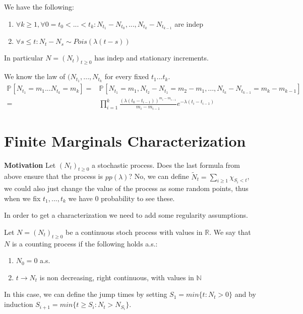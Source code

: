\begin{theorem}
We have the following:
\begin{enumerate}
	\item $\forall k \geq 1, \forall 0=t_0<...<t_k: N_{t_1}-N_{t_0},...,N_{t_k}- N_{t_{k-1}}$ are indep
	\item $\forall s \leq t: N_t - N_s \sim Pois(\lambda (t-s))$
\end{enumerate}
In particular $N=(N_t)_{t\geq 0}$ has indep and stationary increments.
	
\end{theorem}

We know the law of $(N_{t_1},...,N_{t_k}$ for every fixed $t_1...t_k$. 
\begin{align}
	\mathbb{P}_{} \left[ N_{t_1}=m_1...N_{t_k}=m_k \right] =& \mathbb{P}_{} \left[ N_{t_1}=m_1, N_{t_2}-N_{t_1}=m_2 - m_1,..., N_{t_k}-N_{t_{k-1}}=m_k - m_{k-1} \right] \nonumber \\ 
	=& \prod_{i=1}^{k}\frac{(\lambda (t_0 - t_{i-1}))^{m_i-m_{i-1}}}{m_i - m_{i-1}} e^{- \lambda (t_i - t_{i-1})}
\end{align}

\section{Finite Marginals Characterization}
\textbf{Motivation}  Let $(N_t)_{t\geq 0}$ a stochastic process. Does the last formula from above ensure that the process is $pp(\lambda)$? No, we can define $\tilde{N}_t =  \sum_{i \geq 1}^{} \chi_{S_i<t} $, we could also just change the value of the process as some random points, thus when we fix $t_1,...,t_k$ we have 0 probability to see these.

In order to get a characterization we need to add some regularity assumptions.

\begin{defn}
	Let $N=(N_t)_{t \geq 0}$ be a continuous stoch process with values in $\mathbb{R}$. We say that $N$ is a counting process if the following holds a.s.:
\begin{enumerate}
	\item $N_0 = 0$ a.s.
	\item  $t \to N_t$ is non decreasing, right continuous, with values in $\mathbb{N}$ \label{continCond}
\end{enumerate}
In this case, we can define the jump times by setting $S_1=min\{t: N_t >0\}$ and by induction  $S_{i+1}= min\{t \geq S_i: N_t > N_{S_i}\}$.
\end{defn}

